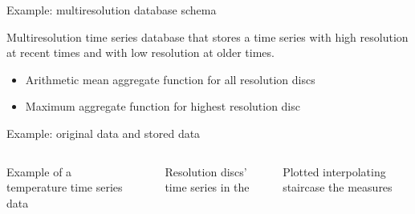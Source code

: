 



\begin{frame}{Example: multiresolution database schema}

  Multiresolution time series database that stores a time series with
  high resolution at recent times and with low resolution at older
  times.


\begin{center}
  \setlength{\unitlength}{1.3mm}
  
\end{center}

\begin{itemize}
\item Arithmetic mean aggregate function for all resolution discs

\item Maximum aggregate function for  highest resolution disc

\end{itemize}



\end{frame}



\begin{frame}{Example: original data and stored data}

  \begin{columns}[l]
    Example of a temperature time series data

    \begin{center}
      
    \end{center}


   Resolution discs' time series in the 

    \begin{center}
      

   {\footnotesize Plotted interpolating staircase the measures}
    \end{center}

 

  \end{columns}

\end{frame}



